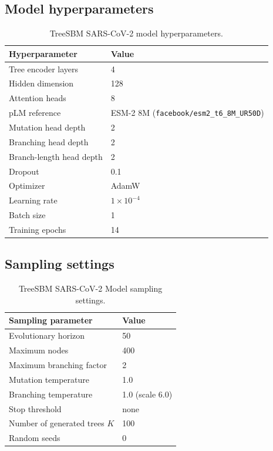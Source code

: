 \subsection{Model hyperparameters}
\label{app:model_hyperparameters}

\begin{table}[H]
\centering
\caption{TreeSBM SARS-CoV-2 model hyperparameters.}
\label{tab:app_hyperparameters}
\begin{tabular}{ll}
\toprule
Hyperparameter & Value \\
\midrule
Tree encoder layers & 4 \\
Hidden dimension & 128 \\
Attention heads & 8 \\
pLM reference & ESM-2 8M (\texttt{facebook/esm2\_t6\_8M\_UR50D}) \\
Mutation head depth & 2 \\
Branching head depth & 2 \\
Branch-length head depth & 2 \\
Dropout & 0.1 \\
Optimizer & AdamW \\
Learning rate & $1\times10^{-4}$ \\
Batch size & 1 \\
Training epochs & 14 \\
\bottomrule
\end{tabular}
\end{table}

\subsection{Sampling settings}
\label{app:sampling_settings}

\begin{table}[H]
\centering
\caption{TreeSBM SARS-CoV-2 Model sampling settings.}
\label{tab:app_sampling_settings}
\begin{tabular}{ll}
\toprule
Sampling parameter & Value \\
\midrule
Evolutionary horizon & 50 \\
Maximum nodes & 400 \\
Maximum branching factor & 2 \\
Mutation temperature & 1.0 \\
Branching temperature & 1.0 (scale 6.0) \\
Stop threshold & none \\
Number of generated trees $K$ & 100 \\
Random seeds & 0 \\
\bottomrule
\end{tabular}
\end{table}
